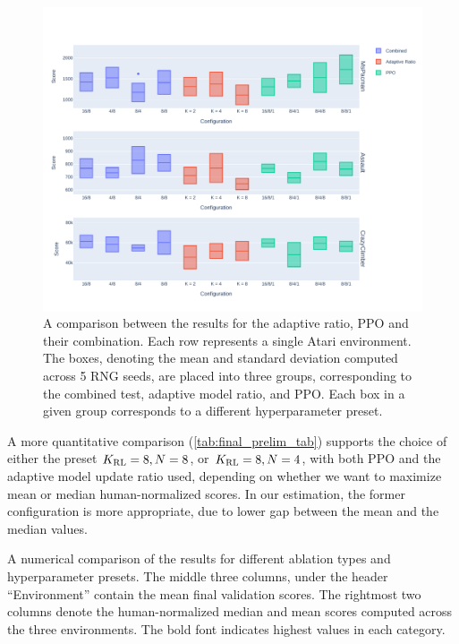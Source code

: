 \documentclass[en]{pracamgr}
\newcommand{\figurewidth}{\linewidth}
\newcommand{\figureheight}{0.8\paperheight}
\begin{document}
\begin{figure}
  \centering
  \includegraphics[width=\figurewidth,height=\figureheight,keepaspectratio]{assets/final_prelim_comp.pdf}
  \caption{A comparison between the results for the adaptive ratio, PPO and their combination. Each row represents a single Atari environment. The boxes, denoting the mean and standard deviation computed across 5 RNG seeds, are placed into three groups, corresponding to the combined test, adaptive model ratio, and PPO. Each box in a given group corresponds to a different hyperparameter preset.}
  \label{fig:final_prelim_comp}
\end{figure}

A more quantitative comparison (\autoref{tab:final_prelim_tab}) supports the choice of either the preset $K_{\rm RL} = 8, N = 8$, or $K_{\rm RL} = 8, N = 4$, with both PPO and the adaptive model update ratio used, depending on whether we want to maximize mean or median human-normalized scores. In our estimation, the former configuration is more appropriate, due to lower gap between the mean and the median values.

\begin{table}
  \centering
  \begin{adjustbox}{width=1.0\textwidth}
    }
  \end{adjustbox}
  \caption{A numerical comparison of the results for different ablation types and hyperparameter presets. The middle three columns, under the header ``Environment'' contain the mean final validation scores. The rightmost two columns denote the human-normalized median and mean scores computed across the three environments. The bold font indicates highest values in each category.}
  \label{tab:final_prelim_tab}
\end{table}
\end{document}
